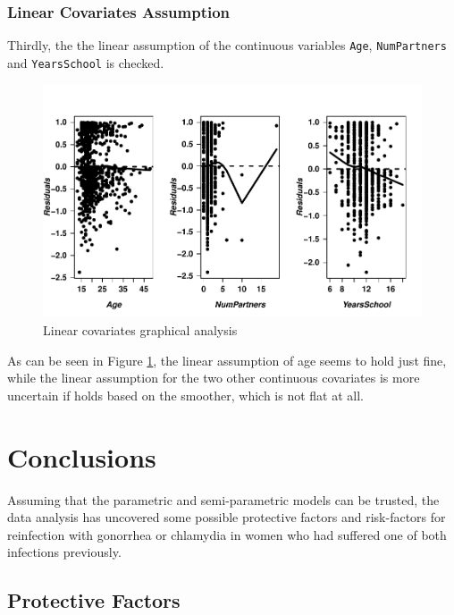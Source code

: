 \documentclass[
]{article}
\begin{document}
\hypertarget{linear-covariates-assumption}{%
\subsubsection{Linear Covariates Assumption}\label{linear-covariates-assumption}}

Thirdly, the the linear assumption of the continuous variables \texttt{Age}, \texttt{NumPartners} and \texttt{YearsSchool} is checked.

\begin{figure}
\centering
\includegraphics{practical_files/figure-latex/linearcovs-1.pdf}
\caption{\label{fig:linearcovs}Linear covariates graphical analysis}
\end{figure}

As can be seen in Figure \ref{fig:linearcovs}, the linear assumption of age seems to hold just fine, while the linear assumption for the two other continuous covariates is more uncertain if holds based on the smoother, which is not flat at all.

\hypertarget{conclusions}{%
\section{Conclusions}\label{conclusions}}

Assuming that the parametric and semi-parametric models can be trusted, the data analysis has uncovered some possible protective factors and risk-factors for reinfection with gonorrhea or chlamydia in women who had suffered one of both infections previously.

\hypertarget{protective-factors}{%
\subsection{Protective Factors}\label{protective-factors}}
\end{document}
